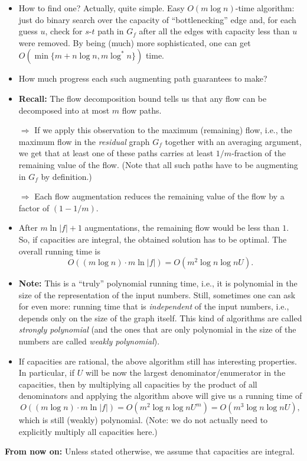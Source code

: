 \documentclass{article}
\begin{document}
\begin{itemize}
	\item How to find one? Actually, quite simple.  Easy $O(m\log n)$-time algorithm: just do binary search over the capacity of ``bottlenecking'' edge and, for each guess $u$, check for $s$-$t$ path in $G_f$ after all the edges with capacity less than $u$ were removed. By being (much) more sophisticated, one can get $O(\min\{ m+n \log n, m \log^*n\})$ time. 
	\item How much progress each such augmenting path guarantees to make?
	\item \textbf{Recall:} The flow decomposition bound tells us that any flow can be decomposed into at most $m$ flow paths. 
	
	$\Rightarrow$ If we apply this observation to the maximum (remaining) flow, i.e., the maximum flow in the {\em residual} graph $G_f$ together with an averaging argument,  we get that at least one of these paths carries at least $1/m$-fraction of the remaining value of the flow. (Note that all such paths have to be augmenting in $G_f$ by definition.)
	
	$\Rightarrow$ Each flow augmentation reduces the remaining value of the flow by a factor of $(1-1/m)$. 
	\item After $m\ln |f| +1$ augmentations, the remaining flow would be less than $1$. So, if capacities are integral, the obtained solution has to be optimal. The overall running time is 
	\[
	O((m\log n)\cdot m \ln |f|)=O(m^2 \log n \log nU).
	\]
	\item \textbf{Note:} This is a ``truly'' polynomial running time, i.e., it is polynomial in the size of the representation of the input numbers. Still, sometimes one can ask for even more: running time that is {\em independent} of the input numbers, i.e., depends only on the size of the graph itself. This kind of algorithms are called {\em strongly polynomial} (and the ones that are only polynomial in the size of the numbers are called {\em weakly polynomial}).
	\item If capacities are rational, the above algorithm still has interesting properties. In particular, if $U$ will be now the largest denominator/enumerator in the capacities, then by multiplying all capacities by the product of all denominators and applying the algorithm above will give us a running time of
	\[
	O((m\log n)\cdot m \ln |f|)=O(m^2 \log n \log nU^m)=O(m^3 \log n \log nU),
	\]
	which is still (weakly) polynomial. (Note: we do not actually need to explicitly multiply all capacities here.)
\end{itemize} 

\textbf{From now on:} Unless stated otherwise, we assume that capacities are integral.  	%
\end{document}
